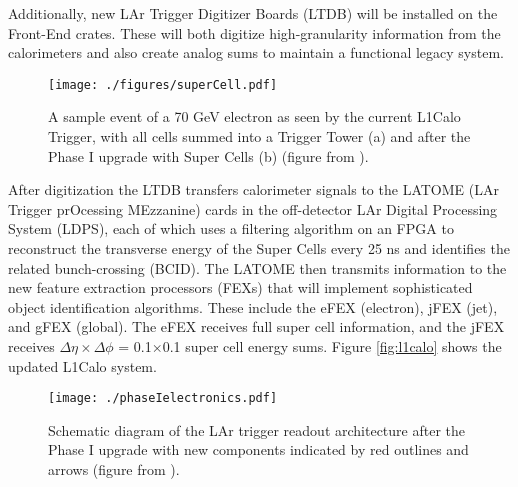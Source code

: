 Additionally, new LAr Trigger Digitizer Boards (LTDB) will be installed on the Front-End crates.  These will both digitize high-granularity information from the calorimeters and also create analog sums to maintain a functional legacy system.  \\

\begin{figure}[h!]
  \centering
	\texttt{[image: ./figures/superCell.pdf]}
\caption[Trigger Towers vs. Super Cells]{\label{fig:superCell}{ A sample event of a 70 GeV electron as seen by the current L1Calo Trigger, with all cells summed into a Trigger Tower (a) and after the Phase I upgrade with Super Cells (b) (figure from \cite{LArPhaseITDR}). }} %
\end{figure}


After digitization the LTDB transfers calorimeter signals to the LATOME (LAr Trigger prOcessing MEzzanine) cards in the off-detector LAr Digital Processing System (LDPS), each of which uses a filtering algorithm on an FPGA to reconstruct the transverse energy of the Super Cells every 25 ns and identifies the related bunch-crossing (BCID).  The LATOME then transmits information to the new feature extraction processors (FEXs) that will implement sophisticated object identification algorithms.  These include the eFEX (electron), jFEX (jet), and gFEX (global).  The eFEX receives full super cell information, and the jFEX receives $\Delta\eta \times \Delta\phi$ = 0.1$\times$0.1 super cell energy sums. Figure \ref{fig:l1calo} shows the updated L1Calo system.  \\%

\begin{figure}[h!]
  \centering
	\texttt{[image: ./phaseIelectronics.pdf]}
\caption[Schematic diagram of the LAr trigger readout architecture after the Phase I upgrade]{\label{fig:phaseIelec}{ Schematic diagram of the LAr trigger readout architecture after the Phase I upgrade with new components indicated by red outlines and arrows (figure from \cite{LArPhaseITDR}). }} %
\end{figure}

